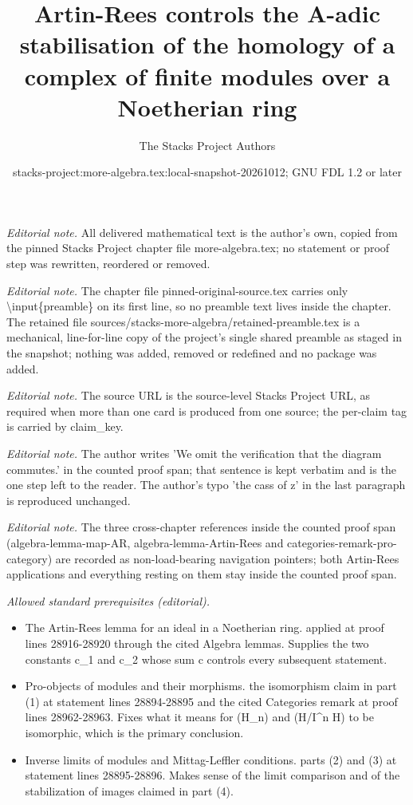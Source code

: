 \documentclass[10pt,a4paper]{amsart}
\title{Artin-Rees controls the A-adic stabilisation of the homology of a complex of finite modules over a Noetherian ring}
\author{The Stacks Project Authors}
\date{stacks-project:more-algebra.tex:local-snapshot-20261012; GNU FDL 1.2 or later}
\theoremstyle{plain}
\theoremstyle{definition}
\theoremstyle{remark}
\numberwithin{equation}{subsection}
\begin{document}
\maketitle
\setcounter{subsection}{1}
\noindent\textit{Editorial note.} All delivered mathematical text is the author's own, copied from the pinned Stacks Project chapter file more-algebra.tex; no statement or proof step was rewritten, reordered or removed.\par\medskip
\noindent\textit{Editorial note.} The chapter file pinned-original-source.tex carries only \textbackslash{}input\{preamble\} on its first line, so no preamble text lives inside the chapter. The retained file sources/stacks-more-algebra/retained-preamble.tex is a mechanical, line-for-line copy of the project's single shared preamble as staged in the snapshot; nothing was added, removed or redefined and no package was added.\par\medskip
\noindent\textit{Editorial note.} The source URL is the source-level Stacks Project URL, as required when more than one card is produced from one source; the per-claim tag is carried by claim\_key.\par\medskip
\noindent\textit{Editorial note.} The author writes 'We omit the verification that the diagram commutes.' in the counted proof span; that sentence is kept verbatim and is the one step left to the reader. The author's typo 'the cass of z' in the last paragraph is reproduced unchanged.\par\medskip
\noindent\textit{Editorial note.} The three cross-chapter references inside the counted proof span (algebra-lemma-map-AR, algebra-lemma-Artin-Rees and categories-remark-pro-category) are recorded as non-load-bearing navigation pointers; both Artin-Rees applications and everything resting on them stay inside the counted proof span.\par\medskip
\noindent\textit{Allowed standard prerequisites (editorial).}\begin{itemize}
\item The Artin-Rees lemma for an ideal in a Noetherian ring. applied at proof lines 28916-28920 through the cited Algebra lemmas. Supplies the two constants c\_1 and c\_2 whose sum c controls every subsequent statement.
\item Pro-objects of modules and their morphisms. the isomorphism claim in part (1) at statement lines 28894-28895 and the cited Categories remark at proof lines 28962-28963. Fixes what it means for (H\_n) and (H/I\textasciicircum{}n H) to be isomorphic, which is the primary conclusion.
\item Inverse limits of modules and Mittag-Leffler conditions. parts (2) and (3) at statement lines 28895-28896. Makes sense of the limit comparison and of the stabilization of images claimed in part (4).
\end{itemize}\medskip
\end{document}
